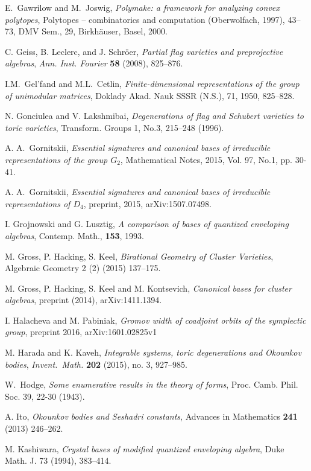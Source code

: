 \documentclass{emsprocart}
\theoremstyle{definition}
\begin{document}
\begin{thebibliography}{7}
E.~Gawrilow and M.~Joswig,
{\it Polymake: a framework for analyzing convex polytopes},
Polytopes -- combinatorics and computation (Oberwolfach, 1997), 43--73, DMV Sem., 29, Birkh\"auser, Basel, 2000.

C. Geiss, B. Leclerc, and J. Schr\"oer, \textit{Partial flag varieties and preprojective algebras}, {\it Ann. Inst.
Fourier}  {\bf 58} (2008), 825--876.

I.M.~Gel'fand and M.L.~Cetlin, 	{\it Finite-dimensional representations of the group of unimodular matrices}, Doklady Akad. Nauk SSSR (N.S.), 71, 1950, 825--828.

N. Gonciulea and V. Lakshmibai, \textit{Degenerations of flag and Schubert varieties
to toric varieties}, Transform. Groups 1, No.3, 215--248 (1996).

A. A.~Gornitskii, \emph{Essential signatures and canonical bases of irreducible representations of the group $G_2$}, Mathematical Notes, 2015, Vol. 97, No.1, pp. 30-41.

A. A.~Gornitskii, \emph{Essential signatures and canonical bases of irreducible representations of $D_4$}, preprint, 2015,
 arXiv:1507.07498.

I. Grojnowski and G. Lusztig, {\it A comparison of bases of quantized enveloping algebras},
Contemp. Math., {\bf 153}, 1993.

M. Gross, P. Hacking, S. Keel, \textit{Birational Geometry of Cluster Varieties}, Algebraic Geometry 2 (2) (2015) 137--175.

M. Gross, P. Hacking, S. Keel and M. Kontsevich,
\textit{Canonical bases for cluster algebras}, preprint (2014),
 arXiv:1411.1394.

I. Halacheva and M. Pabiniak,
{\it Gromov width of coadjoint orbits of the symplectic group},
preprint 2016, arXiv:1601.02825v1

M. Harada and K. Kaveh,  {\it Integrable systems, toric degenerations
and Okounkov bodies},  
\textit{Invent.\ Math.}\/ 
\textbf{202} (2015), no. 3, 927--985.


W.~Hodge, \emph{Some enumerative results in the theory of forms}, Proc. Camb. Phil. Soc. 39, 22-30 (1943).

A. Ito, \emph{Okounkov bodies and Seshadri constants},
Advances in Mathematics {\bf 241} (2013) 246--262.

M. Kashiwara, {\it Crystal bases of modified quantized enveloping algebra}, Duke Math. J. 73 (1994), 383--414.


\end{thebibliography}
\end{document}
